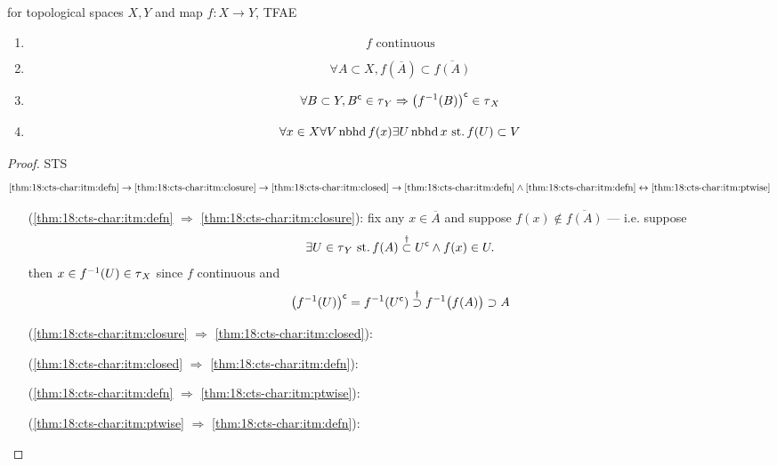\begin{thm}\label{thm:18.1}\label{thm:18:cts-char}
  for topological spaces $X, Y$ and map $f: X\rightarrow Y$, TFAE
  \begin{enumerate}
  \item\label{thm:18:cts-char:itm:defn}
    \[ f \text{ continuous} \]
  \item\label{thm:18:cts-char:itm:closure}
    \[ \forall A\subset X, f(\overline A)\subset\overline{f(A)} \]
  \item\label{thm:18:cts-char:itm:closed}
    \[
    \forall B\subset Y, {B}^{\mathsf{c}}\in\operatorname{\tau}_Y\Rightarrow
    {\big(f^{-1}(B)\big)}^{\mathsf{c}}\in\operatorname{\tau}_X
    \]
  \item\label{thm:18:cts-char:itm:ptwise}
    \[
    \forall x\in X\forall V\operatorname{nbhd} f(x)
    \exists U\operatorname{nbhd} x \operatorname{\,st.} f(U)\subset V
    \]
  \end{enumerate}
\end{thm}
\begin{proof}
  STS
  \[
  \ref{thm:18:cts-char:itm:defn} \rightarrow
  \ref{thm:18:cts-char:itm:closure} \rightarrow
  \ref{thm:18:cts-char:itm:closed} \rightarrow
  \ref{thm:18:cts-char:itm:defn}
  \land
  \ref{thm:18:cts-char:itm:defn} \leftrightarrow
  \ref{thm:18:cts-char:itm:ptwise}
  \]
  \begin{itemize}
  \item[(\ref{thm:18:cts-char:itm:defn} $\Rightarrow$
    \ref{thm:18:cts-char:itm:closure}):]
    fix any $x\in\overline A$ and suppose $f(x)\not\in\overline{f(A)}$
    --- i.e. suppose
    \[
    \exists U\in\operatorname{\tau}_Y \operatorname{\,st.}
    f(A)\stackrel{\dag}{\subset}{U}^{\mathsf{c}} \land f(x)\in U.
    \]
    then $x\in f^{-1}(U)\in\operatorname{\tau}_X$ since $f$ continuous and
    \[
    {\big(f^{-1}(U)\big)}^{\mathsf{c}}=f^{-1}({U}^{\mathsf{c}})
    \stackrel{\dag}{\supset} f^{-1}\big(f(A)\big)\supset A
    \]
  \item[(\ref{thm:18:cts-char:itm:closure} $\Rightarrow$
    \ref{thm:18:cts-char:itm:closed}):]
  \item[(\ref{thm:18:cts-char:itm:closed} $\Rightarrow$
    \ref{thm:18:cts-char:itm:defn}):]
  \item[(\ref{thm:18:cts-char:itm:defn} $\Rightarrow$
    \ref{thm:18:cts-char:itm:ptwise}):]
  \item[(\ref{thm:18:cts-char:itm:ptwise} $\Rightarrow$
    \ref{thm:18:cts-char:itm:defn}):]
  \end{itemize}
\end{proof}
